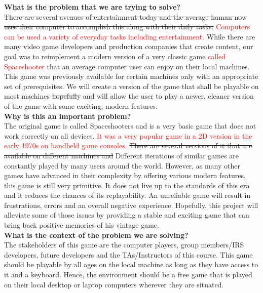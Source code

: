 \documentclass{article}
\begin{document}
\noindent
\textbf{What is the problem that we are trying to solve?}
\smallskip
\\ \sout{There are several avenues of entertainment today and the average human now uses their computer to accomplish this along with their daily tasks.} \textcolor{red}{Computers can be used a variety of everyday tasks including entertainment.} While there are many video game developers and production companies that create content, our goal was to reimplement a modern version of a very classic game \textcolor{red}{called Spaceshooter}  that an average computer user can enjoy on their local machines. This game was previously available for certain machines only with an appropriate set of prerequisites. We will create a version of the game that shall be playable on most machines \sout{hopefully} and will allow the user to play a newer, cleaner version of the game with some \sout{exciting,} modern features.
\bigskip
\\ \textbf{Why is this an important problem?}
\smallskip
\\The original game is called Spaceshooters and is a very basic game that does not work correctly on all devices. \textcolor{red}{It was a very popular game in a 2D version in the early 1970s on handheld game consoles.} \sout{There are several versions of it that are available on different machines and} Different iterations of similar games are constantly played by many users around the world. However, as many other games have advanced in their complexity by offering various modern features, this game is still very primitive. It does not live up to the standards of this era and it reduces the chances of its replayability. An unreliable game will result in frustrations, errors and an overall negative experience. Hopefully, this project will alleviate some of those issues by providing a stable and exciting game that can bring back positive memories of his vintage game. 
\bigskip
\\ \textbf{What is the context of the problem we are solving?}
\smallskip
\\The stakeholders of this game are the computer players, group members/IRS developers, future developers and the TAs/Instructors of this course. This game should be playable by all ages on the local machine as long as they have access to it and a keyboard. Hence, the environment should be a free game that is played on their local desktop or laptop computers wherever they are situated. 
\end{document}
